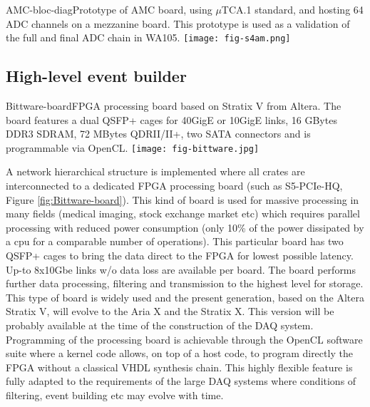 \begin{cdrfigure}{AMC-bloc-diag}{\small Prototype of AMC board, using $\mu$TCA.1 standard, and hosting 64 ADC channels on a mezzanine board. This prototype is used as a validation of the full and final ADC chain in WA105.}
\texttt{[image: fig-s4am.png]}
\end{cdrfigure}


\subsection{High-level event builder}


\begin{cdrfigure}{Bittware-board}{\small FPGA processing board based on Stratix V from Altera. The board features a dual QSFP+ cages for 40GigE or 10GigE links, 16 GBytes DDR3 SDRAM, 72 MBytes QDRII/II+, two SATA connectors and is programmable via OpenCL.}
\texttt{[image: fig-bittware.jpg]}
\end{cdrfigure}


A network hierarchical structure is implemented where all crates are interconnected to a dedicated FPGA processing board (such as S5-PCIe-HQ, Figure \ref{fig:Bittware-board}). This kind of board is used for massive processing in many fields (medical imaging, stock exchange market etc) which requires parallel processing with reduced power consumption (only 10\% of the power dissipated by a cpu for a comparable number of operations). This particular board has two QSFP+ cages to bring the data direct to the FPGA for lowest possible latency. Up-to 8x10Gbe links w/o data loss are available per board.  The board performs further data processing, filtering and transmission to the highest level for storage. This type of board is widely used and the present generation, based on the Altera Stratix V, will evolve to the Aria X and the Stratix X. This version will be probably available at the time of the construction of the DAQ system.\\
Programming of the processing board is achievable through the OpenCL software suite where a kernel code allows, on top of a host code, to program directly the FPGA without a classical VHDL synthesis chain. This highly flexible feature is fully adapted to the requirements of the large DAQ systems where conditions of filtering, event building etc may evolve with time.\\
 
